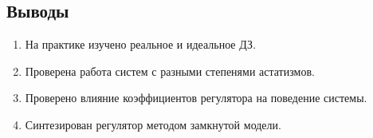 \documentclass[16pt]{article}
\begin{document}
\subsection{Выводы}
\begin{enumerate}
   \item На практике изучено реальное и идеальное ДЗ.
   \item Проверена работа систем с разными степенями астатизмов. 
   \item Проверено влияние коэффициентов регулятора на поведение системы.
   \item Синтезирован регулятор методом замкнутой модели.
\end{enumerate}
\end{document}
